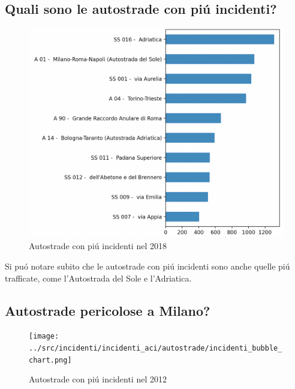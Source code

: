 \documentclass[a4paper]{report}
\begin{document}
\subsection{Quali sono le autostrade con pi\'u incidenti?}
\begin{figure}[!ht]
    \includegraphics[width=\linewidth]{../src/incidenti/incidenti_aci/autostrade/autostrade.png}
    \caption{Autostrade con pi\'u incidenti nel 2018}
    \label{fig:incidenti_autostrade}
\end{figure}

Si pu\'o notare subito che le autostrade con pi\'u incidenti sono anche quelle pi\'u trafficate, come 
l'Autostrada del Sole e l'Adriatica.




\newpage
\subsection{Autostrade pericolose a Milano?}

\begin{figure}[!ht]
    \texttt{[image: ../src/incidenti/incidenti\_aci/autostrade/incidenti\_bubble\_chart.png]}
    \caption{Autostrade con pi\'u incidenti nel 2012}
    \label{fig:bubble_incidenti_milano}
\end{figure}




\newpage
\end{document}
